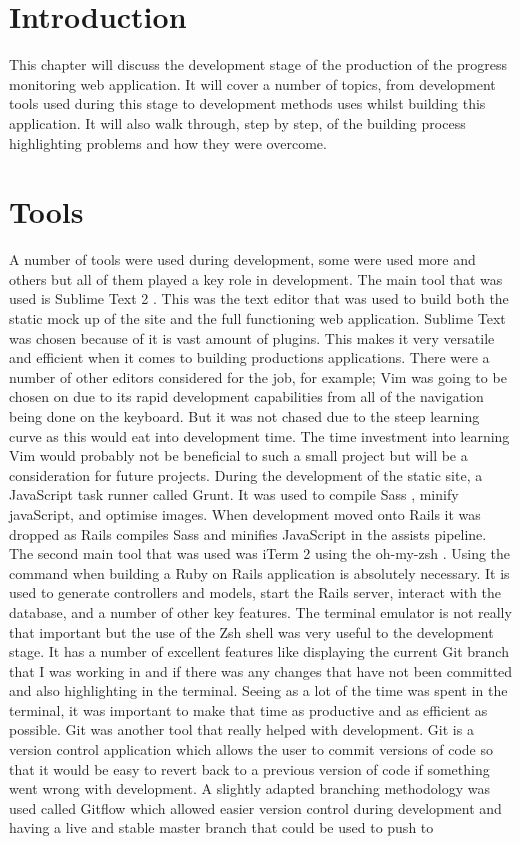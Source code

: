 \section{Introduction}
This chapter will discuss the development stage of the production of the progress monitoring web application. It will cover a number of topics, from development tools used during this stage to development methods uses whilst building this application. It will also walk through, step by step, of the building process highlighting problems and how they were overcome.\\

\section{Tools}
A number of tools were used during development, some were used more and others but all of them played a key role in development. The main tool that was used is Sublime Text 2 \citep{sublimetext:2011}. This was the text editor that was used to build both the static mock up of the site and the full functioning web application. Sublime Text was chosen because of it is vast amount of plugins. This makes it very versatile and efficient when it comes to building productions applications. There were a number of other editors considered for the job, for example; Vim \citep{vim:2013} was going to be chosen on due to its rapid development capabilities from all of the navigation being done on the keyboard. But it was not chased due to the steep learning curve as this would eat into development time. The time investment into learning Vim would probably not be beneficial to such a small project but will be a consideration for future projects. During the development of the static site, a JavaScript task runner called Grunt. It was used to compile Sass \citep{sass:2006}, minify javaScript, and optimise images. When development moved onto Rails it was dropped as Rails compiles Sass and minifies JavaScript in the assists pipeline. The second main tool that was used was iTerm 2 \citep{iterm:2011} using the oh-my-zsh \citep{zsh:2009}. Using the command when building a Ruby on Rails application is absolutely necessary. It is used to generate controllers and models, start the Rails server, interact with the database, and a number of other key features. The terminal emulator is not really that important but the use of the Zsh shell was very useful to the development stage. It has a number of excellent features like displaying the current Git \citep{git:2014} branch that I was working in and if there was any changes that have not been committed and also highlighting in the terminal. Seeing as a lot of the time was spent in the terminal, it was important to make that time as productive and as efficient as possible. Git was another tool that really helped with development. Git is a version control application which allows the user to commit versions of code so that it would be easy to revert back to a previous version of code if something went wrong with development. A slightly adapted branching methodology was used called Gitflow \citep{gitflow:2010} which allowed easier version control during development and having a live and stable master branch that could be used to push to 